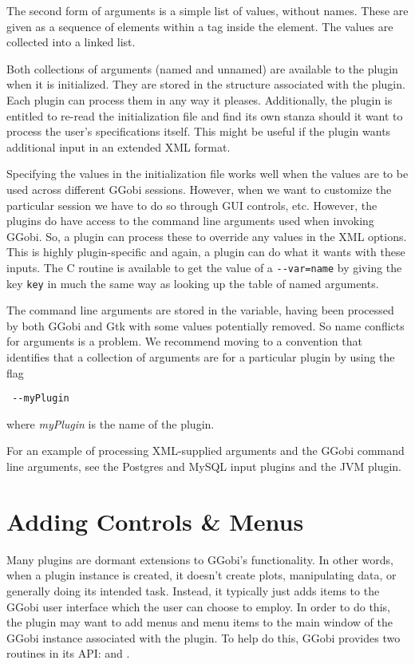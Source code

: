 \documentclass{article}
\begin{document}
The second form of arguments is a simple list of values, without
names.  These are given as a sequence of  elements within
a  tag inside the  element.  The
values are collected into a linked list.

Both collections of arguments (named and unnamed) are available to the
plugin when it is initialized. They are stored in the
 structure associated with the plugin.
Each plugin can process them in any way it pleases.  Additionally, the
plugin is entitled to re-read the initialization file and find its own
stanza should it want to process the user's specifications itself.
This might be useful if the plugin wants additional input in an
extended XML format.

Specifying the values in the initialization file works well when the
values are to be used across different GGobi sessions.  However, when
we want to customize the particular session we have to do so through
GUI controls, etc.  However, the plugins do have access to the command
line arguments used when invoking GGobi.  So, a plugin can process
these to override any values in the XML options.  This is highly
plugin-specific and again, a plugin can do what it wants with these
inputs.  The C routine  is available
to get the value of a \verb+--var=name+ by giving the key \verb+key+
in much the same way as looking up the table of named arguments.

The command line arguments are stored in the
 variable, having been processed by both
GGobi and Gtk with some values potentially removed.  So name conflicts
for arguments is a problem.  We recommend moving to a convention that
identifies that a collection of arguments are for a particular plugin
by using the flag
\begin{verbatim}
 --myPlugin
\end{verbatim}
where \textit{myPlugin} is the name of the plugin.

For an example of processing XML-supplied arguments and the GGobi
command line arguments, see the Postgres and MySQL input plugins and
the JVM plugin.




\section{Adding Controls \& Menus}
Many plugins are dormant extensions to GGobi's functionality. In other
words, when a plugin instance is created, it doesn't create plots,
manipulating data, or generally doing its intended task.  Instead, it
typically just adds items to the GGobi user interface which the user
can choose to employ.  In order to do this, the plugin may want to add
menus and menu items to the main window of the GGobi instance
associated with the plugin.  To help do this,
GGobi provides two routines in its API:
and .
\end{document}
